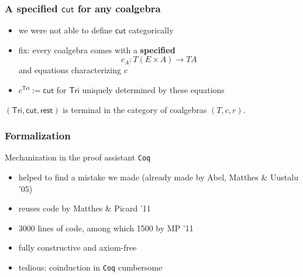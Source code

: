 \documentclass[
]
{beamer}
\newcommand{\constfont}[1]{\ensuremath{\mathsf{#1}}}
\newcommand{\Tri}{\constfont{Tri}}
\newcommand{\tail}{\constfont{rest}}
\newcommand{\redec}{\constfont{redec}}
\newcommand{\cut}{\constfont{cut}}
\newcommand{\Setoid}{\constfont{Setoid}}
\newcommand{\fat}[1]{\textbf{#1}}
\begin{document}
\begin{frame}
 \frametitle{A specified $\cut$ for any coalgebra}
  \begin{itemize}
    \item we were not able to define $\cut$ categorically
    \item fix: every coalgebra comes with a \fat{specified}
       \[ c_A : T (E\times A) \to TA \]
          and equations characterizing $c$
    \item $c^{\Tri} := \cut$ for $\Tri$ uniquely determined by these equations
   \end{itemize}
 \begin{lemma}
  $(\Tri,\cut,\tail)$ is terminal in the category of coalgebras $(T,c,r)$.
 \end{lemma}

\end{frame}


\begin{comment}
\begin{frame}
 \frametitle{Closing remarks}
 
   \begin{block}{Higher order compatibility}
    Observing that $\Setoid$ is cartesian closed, one can encode
       \[ f \sim g  \Longrightarrow \redec~f \sim \redec~g\]
    in definition of coalgebra for signature of $\Tri$
   \end{block}
\end{frame}
\end{comment}
 
\begin{frame}
  \frametitle{Formalization}
   \begin{block}{Mechanization in the proof assistant \texttt{Coq}}
      \begin{itemize}\setlength{\itemsep}{1em}
       \item helped to find a mistake we made (already made by Abel, Matthes \& Uustalu '05)
       \item reuses code by Matthes \& Picard '11
       \item 3000 lines of code, among which 1500 by MP '11
       \item fully constructive and axiom-free
       \item tedious: coinduction in \texttt{Coq} cumbersome
      \end{itemize}
   \end{block}
   
\end{frame}
\end{document}
